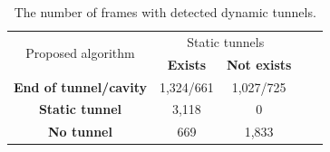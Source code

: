\documentclass[usletter, 10pt, conference]{svjour3}      %
\begin{document}
\begin{table}
\centering
\caption{\label{tab::dyn} The number of frames with detected dynamic tunnels. 
}
\begin{tabular}{ccccc}
\toprule
  \multirow{2}{*}{ Proposed algorithm}   &  \multicolumn{2}{c}{ Static tunnels}   \\
                                     &  {\bf Exists} & {\bf Not exists} \\
\midrule                                     
{\bf End of tunnel/cavity}           & 1,324/661 & 1,027/725  \\
{\bf Static tunnel}                  & 3,118     &  0   \\
{\bf No tunnel}                      & 669      & 1,833    \\ 
\bottomrule                                 
\end{tabular}
\end{table}
\end{document}
